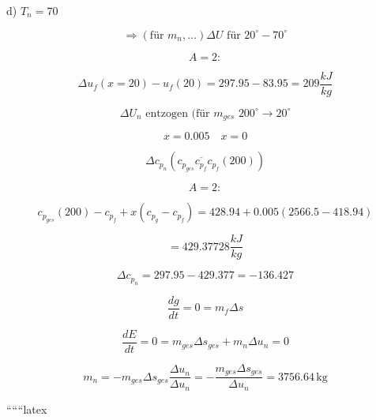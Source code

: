 d) \( T_{n} = 70 \)

\[
\Rightarrow \left( \text{für } m_{n}, \ldots \right) \Delta U \text{ für } 20^\circ - 70^\circ
\]

\[
A = 2:
\]

\[
\Delta u_{f}(x=20) - u_{f}(20) = 297.95 - 83.95 = 209 \frac{kJ}{kg}
\]

\[
\Delta U_{n} \text{ entzogen (für } m_{ges} \text{ 200}^\circ \rightarrow 20^\circ
\]

\[
x = 0.005 \quad x = 0
\]

\[
\Delta c_{p_{n}} (c_{p_{ges}} \overline{c_{p_{f}}} c_{p_{f}} (200))
\]

\[
A = 2:
\]

\[
c_{p_{ges}} (200) - c_{p_{f}} + x (c_{p_{g}} - c_{p_{f}}) = 428.94 + 0.005 \left( 2566.5 - 418.94 \right)
\]

\[
= 429.37728 \frac{kJ}{kg}
\]

\[
\Delta c_{p_{n}} = 297.95 - 429.377 = -136.427
\]

\[
\frac{dg}{dt} = 0 = m_{f} \Delta s
\]

\[
\frac{dE}{dt} = 0 = m_{ges} \Delta s_{ges} + m_{n} \Delta u_{n} = 0
\]

\[
m_{n} = - m_{ges} \Delta s_{ges} \frac{\Delta u_{n}}{\Delta u_{n}} = - \frac{m_{ges} \Delta s_{ges}}{\Delta u_{n}} = 3756.64 \, \text{kg}
\]

``````latex